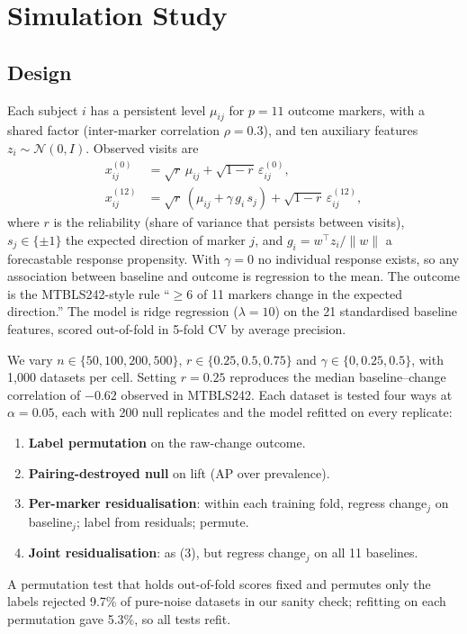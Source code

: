 \documentclass[conference]{IEEEtran}
\begin{document}
\section{Simulation Study}
\label{sec:sim}

\subsection{Design}
Each subject $i$ has a persistent level $\mu_{ij}$ for $p=11$ outcome markers,
with a shared factor (inter-marker correlation $\rho=0.3$), and ten auxiliary
features $z_i\sim\mathcal{N}(0,I)$. Observed visits are
\begin{align}
x^{(0)}_{ij} &= \sqrt{r}\,\mu_{ij} + \sqrt{1-r}\,\varepsilon^{(0)}_{ij},\\
x^{(12)}_{ij} &= \sqrt{r}\,(\mu_{ij} + \gamma\, g_i\, s_j) + \sqrt{1-r}\,\varepsilon^{(12)}_{ij},
\end{align}
where $r$ is the reliability (share of variance that persists between
visits), $s_j\in\{\pm1\}$ the expected direction of marker $j$, and
$g_i = w^\top z_i/\lVert w\rVert$ a forecastable response propensity. With
$\gamma=0$ no individual response exists, so any association between baseline
and outcome is regression to the mean. The outcome is the MTBLS242-style rule
``$\geq$6 of 11 markers change in the expected direction.'' The model is
ridge regression ($\lambda=10$) on the 21 standardised baseline features,
scored out-of-fold in 5-fold CV by average precision.

We vary $n\in\{50,100,200,500\}$, $r\in\{0.25,0.5,0.75\}$ and
$\gamma\in\{0,0.25,0.5\}$, with 1{,}000 datasets per cell. Setting $r=0.25$
reproduces the median baseline--change correlation of $-0.62$ observed in
MTBLS242. Each dataset is tested four ways at $\alpha=0.05$, each with 200
null replicates and the model refitted on every replicate:
\begin{enumerate}
  \item \textbf{Label permutation} on the raw-change outcome.
  \item \textbf{Pairing-destroyed null} on lift (AP over prevalence).
  \item \textbf{Per-marker residualisation}: within each training fold,
        regress change$_j$ on baseline$_j$; label from residuals; permute.
  \item \textbf{Joint residualisation}: as (3), but regress change$_j$ on all
        11 baselines.
\end{enumerate}
A permutation test that holds out-of-fold scores fixed and permutes only the
labels rejected 9.7\% of pure-noise datasets in our sanity check; refitting
on each permutation \cite{ojala2010} gave 5.3\%, so all tests refit.
\end{document}
